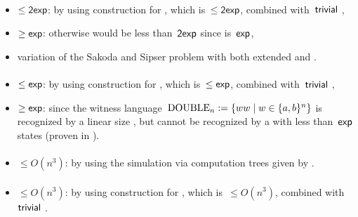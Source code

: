 \paragraph{\OMOLA{}\tto\OMODLA}
\begin{itemize}
	\item $\le\mathsf{2exp}$: by using construction for \hyperref[cost:OM1LAto1DFA]{\OMOLA{}\tto\ODFA}, which is~$\le\mathsf{2exp}$, combined with~$\mathsf{trivial}$ \ODFA{}\tto\OMODLA,
	\item $\ge\mathsf{exp}$: otherwise \hyperref[cost:OM1LAto1DFA]{\OMOLA{}\tto\ODFA} would be less than~$\mathsf{2exp}$ since \hyperref[cost:OM1DLAto1DFA]{\OMODLA{}\tto\ODFA} is~$\mathsf{exp}$,
	\item variation of the Sakoda and Sipser problem with both extended \TNFA and \TDFA.
\end{itemize}
\paragraph{\OMODLA{}\tto\ONFA}
\begin{itemize}
	\item $\le\mathsf{exp}$: by using construction for \hyperref[cost:OM1DLAto1DFA]{\OMODLA{}\tto\ODFA}, which is~$\le\mathsf{exp}$, combined with~$\mathsf{trivial}$ \ODFA{}\tto\ONFA,
	\item $\ge\mathsf{exp}$: since the witness language~$\mathrm{DOUBLE}_n:=\{ww\mid w\in\{a,b\}^n\}$ is recognized by a linear size \OMODLA, but cannot be recognized by a \ONFA with less than~$\mathsf{exp}$ states (proven in ).
\end{itemize}
\paragraph{\OMODLA{}\tto\TDFA}\label{cost:OM1DLAto2DFA}
\begin{itemize}
	\item $\le O(n^3)$: by using the simulation via computation trees given by .
\end{itemize}
\paragraph{\OMODLA{}\tto\TNFA}
\begin{itemize}
	\item $\le O(n^3)$: by using construction for \hyperref[cost:OM1DLAto2DFA]{\OMODLA{}\tto\TDFA}, which is~$\le O(n^3)$, combined with~$\mathsf{trivial}$ \TDFA{}\tto\TNFA.
\end{itemize}



